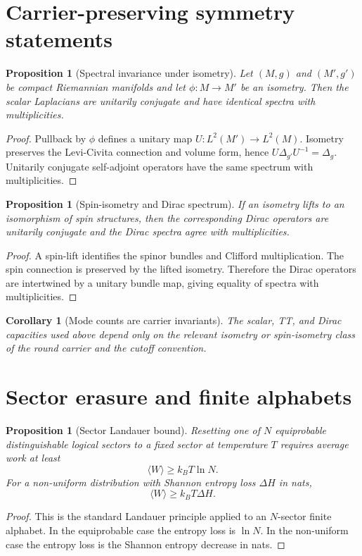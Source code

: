 \documentclass[11pt,a4paper]{article}
\newtheorem{proposition}[theorem]{Proposition}
\newtheorem{corollary}[theorem]{Corollary}
\begin{document}
\section{Carrier-preserving symmetry statements}

\begin{proposition}[Spectral invariance under isometry]
Let $(M,g)$ and $(M',g')$ be compact Riemannian manifolds and let $\phi:M\to M'$ be an isometry.  Then the scalar Laplacians are unitarily conjugate and have identical spectra with multiplicities.
\end{proposition}
\begin{proof}
Pullback by $\phi$ defines a unitary map $U:L^2(M')\to L^2(M)$.  Isometry preserves the Levi-Civita connection and volume form, hence $U\Delta_{g'}U^{-1}=\Delta_g$.  Unitarily conjugate self-adjoint operators have the same spectrum with multiplicities.\end{proof}

\begin{proposition}[Spin-isometry and Dirac spectrum]
If an isometry lifts to an isomorphism of spin structures, then the corresponding Dirac operators are unitarily conjugate and the Dirac spectra agree with multiplicities.
\end{proposition}
\begin{proof}
A spin-lift identifies the spinor bundles and Clifford multiplication.  The spin connection is preserved by the lifted isometry.  Therefore the Dirac operators are intertwined by a unitary bundle map, giving equality of spectra with multiplicities.\end{proof}

\begin{corollary}[Mode counts are carrier invariants]
The scalar, TT, and Dirac capacities used above depend only on the relevant isometry or spin-isometry class of the round carrier and the cutoff convention.
\end{corollary}

\section{Sector erasure and finite alphabets}

\begin{proposition}[Sector Landauer bound]
Resetting one of $N$ equiprobable distinguishable logical sectors to a fixed sector at temperature $T$ requires average work at least~\cite{Landauer1961}
\[
\langle W\rangle\ge k_BT\ln N.
\]
For a non-uniform distribution with Shannon entropy loss $\Delta H$ in nats,
\[
\langle W\rangle\ge k_BT\Delta H.
\]
\end{proposition}
\begin{proof}
This is the standard Landauer principle applied to an $N$-sector finite alphabet.  In the equiprobable case the entropy loss is $\ln N$.  In the non-uniform case the entropy loss is the Shannon entropy decrease in nats.\end{proof}
\end{document}
